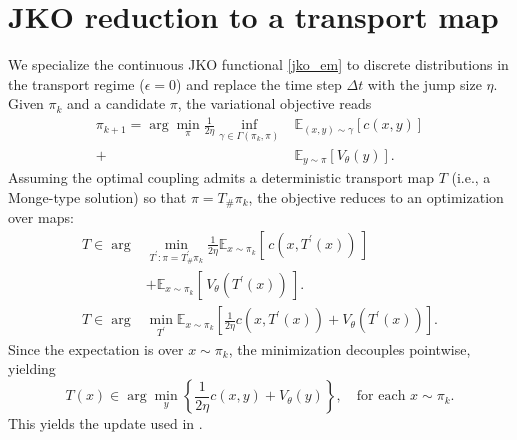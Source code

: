 \section{JKO reduction to a transport map}
\label{app:jko}

We specialize the continuous JKO functional \eqref{jko_em} to discrete distributions in the
transport regime ($\epsilon=0$) and replace the time step $\Delta t$ with the jump size $\eta$.
Given $\pi_k$ and a candidate $\pi$, the variational objective reads
\begin{align}
    \pi_{k+1} = \arg\min_{\pi}
    \frac{1}{2\eta}\inf_{\gamma\in\Gamma(\pi_k,\pi)}&\mathbb{E}_{(x,y)\sim\gamma}[c(x,y)]
    \nonumber\\
    + &\mathbb{E}_{y\sim\pi}[V_\theta(y)].
\end{align}
Assuming the optimal coupling admits a deterministic transport map $T$ (i.e., a Monge-type
solution) so that $\pi = T_{\#}\pi_k$, the objective reduces to an optimization over maps:
\begin{align}
    T \in \arg&\min_{T^\prime:\pi=T^\prime_{\#}\pi_k}
    \frac{1}{2\eta}\mathbb{E}_{x\sim\pi_k}[\,c(x,T^\prime(x))\,] \nonumber\\
    & + \mathbb{E}_{x\sim\pi_k}[\,V_\theta(T^\prime(x))\,].\\[5pt]
    T \in \arg&\min_{T^\prime}\mathbb{E}_{x\sim\pi_k}\left[\frac{1}{2\eta}c(x,T^\prime(x))+V_\theta(T^\prime(x))\right].
\end{align}
Since the expectation is over $x\sim\pi_k$, the minimization decouples pointwise, yielding
\begin{equation}
    T(x)\in\arg\min_{y}\left\{\frac{1}{2\eta}c(x,y)+V_\theta(y)\right\},\quad\text{for each }x\sim\pi_k.
\end{equation}
This yields the update used in
.

